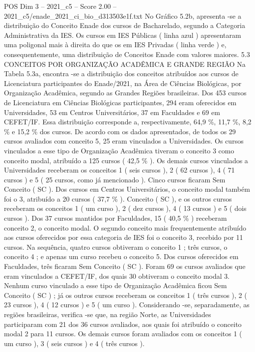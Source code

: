 \begin{textsample}{POS Dim 3 – 2021\_c5 – Score 2.00 – 2021\_c5/enade\_2021\_ci\_bio\_d313503e1f.txt}
No Gráfico 5.2b, apresenta -se a distribuição do Conceito Enade dos cursos de Bacharelado, segundo a Categoria Administrativa da IES.
Os cursos em IES Públicas ( linha azul ) apresentaram uma poligonal mais à direita do que os em IES Privadas ( linha verde ) e, consequentemente, uma distribuição de Conceitos Enade com valores maiores. 5.3 CONCEITOS POR ORGANIZAÇÃO ACADÊMICA E GRANDE REGIÃO Na Tabela 5.3a, encontra -se a distribuição dos conceitos atribuídos aos cursos de Licenciatura participantes do Enade/2021, na Área de Ciências Biológicas, por Organização Acadêmica, segundo as Grandes Regiões brasileiras.
Dos 453 cursos de Licenciatura em Ciências Biológicas participantes, 294 eram oferecidos em Universidades, 53 em Centros Universitários, 37 em Faculdades e 69 em CEFET/IF.
Essa distribuição corresponde a, respectivamente, 64,9 \%, 11,7 \%, 8,2 \% e 15,2 \% dos cursos.
De acordo com os dados apresentados, de todos os 29 cursos avaliados com conceito 5, 25 eram vinculados a Universidades.
Os cursos vinculados a esse tipo de Organização Acadêmica tiveram o conceito 3 como conceito modal, atribuído a 125 cursos ( 42,5 \% ).
Os demais cursos vinculados a Universidades receberam os conceitos 1 ( seis cursos ), 2 ( 62 cursos ), 4 ( 71 cursos ) e 5 ( 25 cursos, como já mencionado ).
Cinco cursos ficaram Sem Conceito ( SC ).
Dos cursos em Centros Universitários, o conceito modal também foi o 3, atribuído a 20 cursos ( 37,7 \% ).
Conceito ( SC ), e os outros cursos receberam os conceitos 1 ( um curso ), 2 ( dez cursos ), 4 ( 13 cursos ) e 5 ( dois cursos ).
Dos 37 cursos mantidos por Faculdades, 15 ( 40,5 \% ) receberam conceito 2, o conceito modal.
O segundo conceito mais frequentemente atribuído aos cursos oferecidos por essa categoria de IES foi o conceito 3, recebido por 11 cursos.
Na sequência, quatro cursos obtiveram o conceito 1 ; três cursos, o conceito 4 ; e apenas um curso recebeu o conceito 5.
Dos cursos oferecidos em Faculdades, três ficaram Sem Conceito ( SC ).
Foram 69 os cursos avaliados que eram vinculados a CEFET/IF, dos quais 30 obtiveram o conceito modal 3.
Nenhum curso vinculado a esse tipo de Organização Acadêmica ficou Sem Conceito ( SC ) ; já os outros cursos receberam os conceitos 1 ( três cursos ), 2 ( 23 cursos ), 4 ( 12 cursos ) e 5 ( um curso ).
Considerando -se, separadamente, as regiões brasileiras, verifica -se que, na região Norte, as Universidades participaram com 21 dos 36 cursos avaliados, aos quais foi atribuído o conceito modal 2 para 11 cursos.
Os demais cursos foram avaliados com os conceitos 1 ( um curso ), 3 ( seis cursos ) e 4 ( três cursos ).

\end{textsample}
